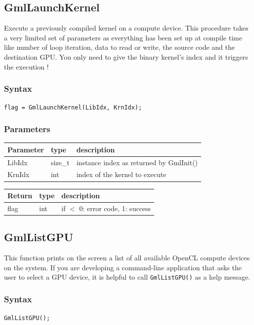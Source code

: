 \documentclass[a4paper,12pt]{article}
\begin{document}
\subsection{GmlLaunchKernel}
Execute a previously compiled kernel on a compute device. This procedure takes a very limited set of parameters as everything has been set up at compile time like number of loop iteration, data to read or write, the source code and the destination GPU. You only need to give the binary kernel's index and it triggers the execution !

\subsubsection*{Syntax}
{\tt flag = GmlLaunchKernel(LibIdx, KrnIdx);}

\subsubsection*{Parameters}
\begin{tabular}{|m{2cm}|m{1.5cm}|m{10.5cm}|}
\hline
Parameter  & type    & description \\
\hline
LibIdx     & size\_t & instance index as returned by GmlInit() \\
\hline
KrnIdx     & int     & index of the kernel to execute \\
\hline
\end{tabular}

\medskip

\begin{tabular}{|m{2cm}|m{1.5cm}|m{10.5cm}|}
\hline
Return     & type    & description \\
\hline
flag       & int     & if $<$ 0: error code, 1: success \\
\hline
\end{tabular}


\subsection{GmlListGPU}
This function prints on the screen a list of all available OpenCL compute devices on the system. If you are developing a command-line application that asks the user to select a GPU device, it is helpful to call {\tt GmlListGPU()} as a help message.

\subsubsection*{Syntax}
{\tt GmlListGPU();}
\end{document}
